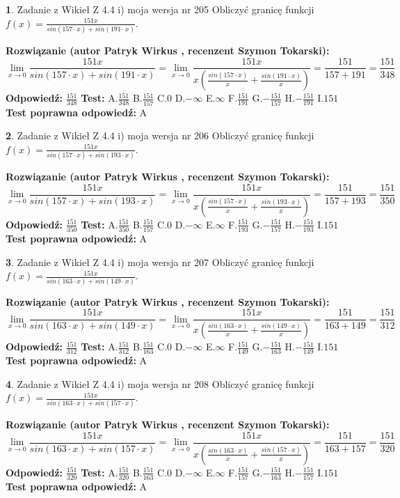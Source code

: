 \documentclass[12pt, a4paper]{article}
\theoremstyle{definition} %
\newtheorem{zad}{}
\newcommand{\zadStart}[1]{\begin{zad}#1\newline}
\newcommand{\zadStop}{\end{zad}}
\newcommand{\rozwStart}[2]{\noindent \textbf{Rozwiązanie (autor #1 , recenzent #2): }\newline}
\newcommand{\rozwStop}{\newline}
\newcommand{\odpStart}{\noindent \textbf{Odpowiedź:}\newline}
\newcommand{\odpStop}{\newline}
\newcommand{\testStart}{\noindent \textbf{Test:}\newline}
\newcommand{\testStop}{\newline}
\newcommand{\kluczStart}{\noindent \textbf{Test poprawna odpowiedź:}\newline}
\newcommand{\kluczStop}{\newline}
\begin{document}
\zadStart{Zadanie z Wikieł Z 4.4 i) moja wersja nr 205}
Obliczyć granicę funkcji $f(x)=\frac{151x}{sin(157\cdot x) +sin(191\cdot x)}$.
\zadStop
\rozwStart{Patryk Wirkus}{Szymon Tokarski}
$$\lim\limits_{x\to 0}\frac{151x}{sin(157\cdot x) +sin(191\cdot x)}=\lim\limits_{x\to 0}\frac{151x}{x(\frac{sin(157\cdot x)}{x}+\frac{sin(191\cdot x)}{x})}=\frac{151}{157+191} = \frac{151}{348}$$
\rozwStop
\odpStart
$\frac{151}{348}$
\odpStop
\testStart
A.$\frac{151}{348}$
B.$\frac{151}{157}$
C.$0$
D.$-\infty$
E.$\infty$
F.$\frac{151}{191}$
G.$-\frac{151}{157}$
H.$-\frac{151}{191}$
I.$151$
\testStop
\kluczStart
A
\kluczStop



\zadStart{Zadanie z Wikieł Z 4.4 i) moja wersja nr 206}
Obliczyć granicę funkcji $f(x)=\frac{151x}{sin(157\cdot x) +sin(193\cdot x)}$.
\zadStop
\rozwStart{Patryk Wirkus}{Szymon Tokarski}
$$\lim\limits_{x\to 0}\frac{151x}{sin(157\cdot x) +sin(193\cdot x)}=\lim\limits_{x\to 0}\frac{151x}{x(\frac{sin(157\cdot x)}{x}+\frac{sin(193\cdot x)}{x})}=\frac{151}{157+193} = \frac{151}{350}$$
\rozwStop
\odpStart
$\frac{151}{350}$
\odpStop
\testStart
A.$\frac{151}{350}$
B.$\frac{151}{157}$
C.$0$
D.$-\infty$
E.$\infty$
F.$\frac{151}{193}$
G.$-\frac{151}{157}$
H.$-\frac{151}{193}$
I.$151$
\testStop
\kluczStart
A
\kluczStop



\zadStart{Zadanie z Wikieł Z 4.4 i) moja wersja nr 207}
Obliczyć granicę funkcji $f(x)=\frac{151x}{sin(163\cdot x) +sin(149\cdot x)}$.
\zadStop
\rozwStart{Patryk Wirkus}{Szymon Tokarski}
$$\lim\limits_{x\to 0}\frac{151x}{sin(163\cdot x) +sin(149\cdot x)}=\lim\limits_{x\to 0}\frac{151x}{x(\frac{sin(163\cdot x)}{x}+\frac{sin(149\cdot x)}{x})}=\frac{151}{163+149} = \frac{151}{312}$$
\rozwStop
\odpStart
$\frac{151}{312}$
\odpStop
\testStart
A.$\frac{151}{312}$
B.$\frac{151}{163}$
C.$0$
D.$-\infty$
E.$\infty$
F.$\frac{151}{149}$
G.$-\frac{151}{163}$
H.$-\frac{151}{149}$
I.$151$
\testStop
\kluczStart
A
\kluczStop



\zadStart{Zadanie z Wikieł Z 4.4 i) moja wersja nr 208}
Obliczyć granicę funkcji $f(x)=\frac{151x}{sin(163\cdot x) +sin(157\cdot x)}$.
\zadStop
\rozwStart{Patryk Wirkus}{Szymon Tokarski}
$$\lim\limits_{x\to 0}\frac{151x}{sin(163\cdot x) +sin(157\cdot x)}=\lim\limits_{x\to 0}\frac{151x}{x(\frac{sin(163\cdot x)}{x}+\frac{sin(157\cdot x)}{x})}=\frac{151}{163+157} = \frac{151}{320}$$
\rozwStop
\odpStart
$\frac{151}{320}$
\odpStop
\testStart
A.$\frac{151}{320}$
B.$\frac{151}{163}$
C.$0$
D.$-\infty$
E.$\infty$
F.$\frac{151}{157}$
G.$-\frac{151}{163}$
H.$-\frac{151}{157}$
I.$151$
\testStop
\kluczStart
A
\kluczStop
\end{document}
